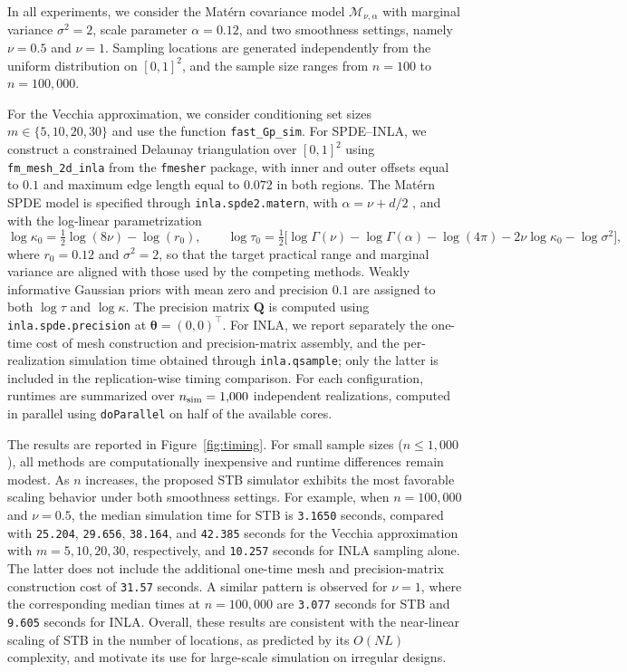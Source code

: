 \documentclass[
  12pt]{article}
\begin{document}
In all experiments, we consider the Mat\'ern covariance model $\mathcal{M}_{\nu,\alpha}$ with marginal variance $\sigma^2=2$, scale parameter $\alpha=0.12$, and two smoothness settings, namely $\nu=0.5$ and $\nu=1$.
Sampling locations are generated independently from the uniform distribution on $[0,1]^2$, and the sample size ranges from $n=100$ to $n=100{,}000$.

For the Vecchia approximation, we consider conditioning set sizes $m\in\{5,10,20,30\}$ and use the function \texttt{fast\_Gp\_sim}.
For SPDE--INLA, we construct a constrained Delaunay triangulation over $[0,1]^2$ using \texttt{fm\_mesh\_2d\_inla} from the \texttt{fmesher} package, with inner and outer offsets equal to $0.1$ and maximum edge length equal to $0.072$ in both regions.
The Mat\'ern SPDE model is specified through \texttt{inla.spde2.matern}, with $\alpha=\nu+d/2$ \citep{Lindgren:Rue:Lindstrom:2011}, and with the log-linear parametrization
\[
\log\kappa_0 = \tfrac{1}{2}\log(8\nu) - \log(r_0),
\qquad
\log\tau_0 = \tfrac{1}{2}
\bigl[\log\Gamma(\nu)-\log\Gamma(\alpha)-\log(4\pi)
-2\nu\log\kappa_0-\log\sigma^2\bigr],
\]
where $r_0=0.12$ and $\sigma^2=2$, so that the target practical range and marginal variance are aligned with those used by the competing methods.
Weakly informative Gaussian priors with mean zero and precision $0.1$ are assigned to both $\log\tau$ and $\log\kappa$.
The precision matrix $\mathbf{Q}$ is computed using \texttt{inla.spde.precision} at $\boldsymbol{\theta}=(0,0)^\top$.
For INLA, we report separately the one-time cost of mesh construction and precision-matrix assembly, and the per-realization simulation time obtained through \texttt{inla.qsample}; only the latter is included in the replication-wise timing comparison.
For each configuration, runtimes are summarized over $n_{\rm sim}=1{,}000$ independent realizations, computed in parallel using \texttt{doParallel} on half of the available cores.

The results are reported in Figure~\ref{fig:timing}.
For small sample sizes ($n\le 1{,}000$), all methods are computationally inexpensive and runtime differences remain modest.
As $n$ increases, the proposed STB simulator exhibits the most favorable scaling behavior under both smoothness settings.
For example, when $n=100{,}000$ and $\nu=0.5$, the median simulation time for STB is \texttt{3.1650} seconds, compared with \texttt{25.204}, \texttt{29.656}, \texttt{38.164}, and \texttt{42.385} seconds for the Vecchia approximation with $m=5,10,20,30$, respectively, and \texttt{10.257} seconds for INLA sampling alone.
The latter does not include the additional one-time mesh and precision-matrix construction cost of \texttt{31.57} seconds.
A similar pattern is observed for $\nu=1$, where the corresponding median times at $n=100{,}000$ are \texttt{3.077} seconds for STB and \texttt{9.605} seconds for INLA.
Overall, these results are consistent with the near-linear scaling of STB in the number of locations, as predicted by its $O(NL)$ complexity, and motivate its use for large-scale simulation on irregular designs.
\end{document}
